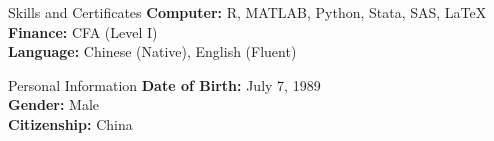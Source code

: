 \documentclass{resume_liang} %
\begin{document}
\begin{rSection}{Skills and Certificates}
{\bf Computer:} R, MATLAB, Python, Stata, SAS, LaTeX
\\
{\bf Finance:} CFA (Level I)
\\
{\bf Language:} Chinese (Native), English (Fluent) 
\end{rSection}
\bigskip \bigskip









\begin{rSection}{Personal Information }
{\bf Date of Birth:} July 7, 1989  \\
{\bf Gender:} Male  \\
{\bf Citizenship:} China
\\
\end{rSection}
\end{document}
